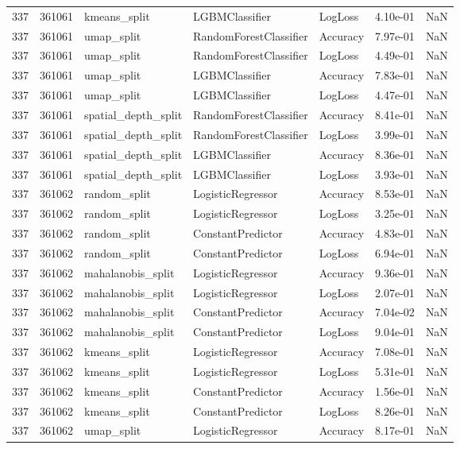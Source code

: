 \begin{tabular}{rrlllrr}
337 & 361061 & kmeans\_split & LGBMClassifier & LogLoss & 4.10e-01 & NaN \\
337 & 361061 & umap\_split & RandomForestClassifier & Accuracy & 7.97e-01 & NaN \\
337 & 361061 & umap\_split & RandomForestClassifier & LogLoss & 4.49e-01 & NaN \\
337 & 361061 & umap\_split & LGBMClassifier & Accuracy & 7.83e-01 & NaN \\
337 & 361061 & umap\_split & LGBMClassifier & LogLoss & 4.47e-01 & NaN \\
337 & 361061 & spatial\_depth\_split & RandomForestClassifier & Accuracy & 8.41e-01 & NaN \\
337 & 361061 & spatial\_depth\_split & RandomForestClassifier & LogLoss & 3.99e-01 & NaN \\
337 & 361061 & spatial\_depth\_split & LGBMClassifier & Accuracy & 8.36e-01 & NaN \\
337 & 361061 & spatial\_depth\_split & LGBMClassifier & LogLoss & 3.93e-01 & NaN \\
337 & 361062 & random\_split & LogisticRegressor & Accuracy & 8.53e-01 & NaN \\
337 & 361062 & random\_split & LogisticRegressor & LogLoss & 3.25e-01 & NaN \\
337 & 361062 & random\_split & ConstantPredictor & Accuracy & 4.83e-01 & NaN \\
337 & 361062 & random\_split & ConstantPredictor & LogLoss & 6.94e-01 & NaN \\
337 & 361062 & mahalanobis\_split & LogisticRegressor & Accuracy & 9.36e-01 & NaN \\
337 & 361062 & mahalanobis\_split & LogisticRegressor & LogLoss & 2.07e-01 & NaN \\
337 & 361062 & mahalanobis\_split & ConstantPredictor & Accuracy & 7.04e-02 & NaN \\
337 & 361062 & mahalanobis\_split & ConstantPredictor & LogLoss & 9.04e-01 & NaN \\
337 & 361062 & kmeans\_split & LogisticRegressor & Accuracy & 7.08e-01 & NaN \\
337 & 361062 & kmeans\_split & LogisticRegressor & LogLoss & 5.31e-01 & NaN \\
337 & 361062 & kmeans\_split & ConstantPredictor & Accuracy & 1.56e-01 & NaN \\
337 & 361062 & kmeans\_split & ConstantPredictor & LogLoss & 8.26e-01 & NaN \\
337 & 361062 & umap\_split & LogisticRegressor & Accuracy & 8.17e-01 & NaN \\

\end{tabular}
